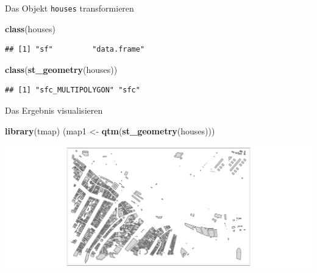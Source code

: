 \documentclass[ignorenonframetext,]{beamer}
\newenvironment{Shaded}{\begin{snugshade}}{\end{snugshade}}
\newcommand{\KeywordTok}[1]{\textcolor[rgb]{0.26,0.66,0.93}{\textbf{#1}}}
\newcommand{\NormalTok}[1]{\textcolor[rgb]{0.74,0.68,0.62}{#1}}
\newcommand{\StringTok}[1]{\textcolor[rgb]{0.02,0.61,0.04}{#1}}
\begin{document}
\begin{frame}[fragile]{Das Objekt \texttt{houses} transformieren}
\protect\hypertarget{das-objekt-houses-transformieren}{}

\begin{Shaded}
\begin{Highlighting}[]
\KeywordTok{class}\NormalTok{(houses)}
\end{Highlighting}
\end{Shaded}

\begin{verbatim}
## [1] "sf"         "data.frame"
\end{verbatim}

\begin{Shaded}
\begin{Highlighting}[]
\KeywordTok{class}\NormalTok{(}\KeywordTok{st_geometry}\NormalTok{(houses))}
\end{Highlighting}
\end{Shaded}

\begin{verbatim}
## [1] "sfc_MULTIPOLYGON" "sfc"
\end{verbatim}

\end{frame}

\begin{frame}[fragile]{Das Ergebnis visualisieren}
\protect\hypertarget{das-ergebnis-visualisieren}{}

\begin{Shaded}
\begin{Highlighting}[]
\KeywordTok{library}\NormalTok{(tmap)}
\NormalTok{(map1 <-}\StringTok{ }\KeywordTok{qtm}\NormalTok{(}\KeywordTok{st_geometry}\NormalTok{(houses)))}
\end{Highlighting}
\end{Shaded}

\includegraphics{B7_simplefeatures_files/figure-beamer/unnamed-chunk-33-1.pdf}

\end{frame}
\end{document}
